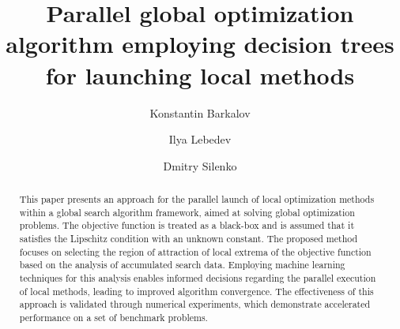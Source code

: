 \documentclass[runningheads]{llncs}
\begin{document}
%
\title{Parallel global optimization algorithm employing decision trees for launching local methods}
%
%
\author{Konstantin Barkalov \and
Ilya Lebedev \and
Dmitry Silenko}
%
%
%
\maketitle              %
%
\begin{abstract}

This paper presents an approach for the parallel launch of local optimization methods within a global search algorithm framework, aimed at solving global optimization problems. The objective function is treated as a black-box and is assumed that it satisfies the Lipschitz condition with an unknown constant. The proposed method focuses on selecting the region of attraction of local extrema of the objective function based on the analysis of accumulated search data. Employing machine learning techniques for this analysis enables informed decisions regarding the parallel execution of local methods, leading to improved algorithm convergence. The effectiveness of this approach is validated through numerical experiments, which demonstrate accelerated performance on a set of benchmark problems.


\end{abstract}
%
%
%
\end{document}
